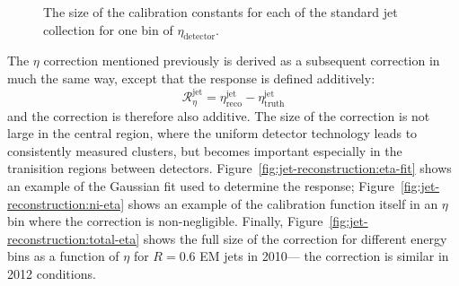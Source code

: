 

\begin{figure}
\centering
{}
\label{fig:jet-reconstruction:total_jes}
\caption{The size of the calibration constants for each of the standard jet collection for one bin of $\eta_\mathrm{detector}$.}
\end{figure}


The $\eta$ correction mentioned previously is derived as a subsequent correction in much the same way, except that the response is defined additively:
%
\begin{equation}
\mathcal{R}_\eta^\mathrm{jet} = \eta^{\mathrm{jet}}_{\mathrm{reco}} -  \eta^{\mathrm{jet}}_{\mathrm{truth}} 
\end{equation}
%
and the correction is therefore also additive. The size of the correction is not large in the central region, where the uniform detector technology leads to consistently measured clusters, but becomes important especially in the tranisition regions between detectors. Figure~\ref{fig:jet-reconstruction:eta-fit} shows an example of the Gaussian fit used to determine the response; Figure~\ref{fig:jet-reconstruction:ni-eta} shows an example of the calibration function itself in an $\eta$ bin where the correction is non-negligible. Finally, Figure~\ref{fig:jet-reconstruction:total-eta} shows the full size of the correction for different energy bins as a function of $\eta$ for $R=0.6$ EM jets in 2010--- the correction is similar in 2012 conditions.

